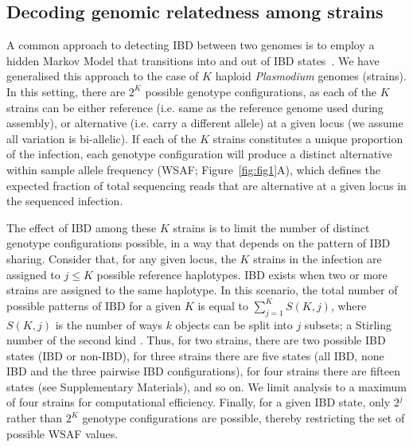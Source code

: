 \documentclass[9pt,lineno]{elife}
\begin{document}
\subsection{Decoding genomic relatedness among strains}

A common approach to detecting IBD between two genomes is to employ a hidden Markov Model that transitions into and out of IBD states~\citep{Chang2015, Gusev2009, Gusev2011}.  We have generalised this approach to the case of $K$ haploid {\it Plasmodium} genomes (strains). In this setting, there are $2^K$ possible genotype configurations, as each of the $K$ strains can be either reference (i.e. same as the reference genome used during assembly), or alternative (i.e. carry a different allele) at a given locus (we assume all variation is bi-allelic). If each of the $K$ strains constitutes a unique proportion of the infection, each genotype configuration will produce a distinct alternative within sample allele frequency (WSAF; Figure~\ref{fig:fig1}A), which defines the expected fraction of total sequencing reads that are alternative at a given locus in the sequenced infection.

The effect of IBD among these $K$ strains is to limit the number of distinct genotype configurations possible, in a way that depends on the pattern of IBD sharing. Consider that, for any given locus, the $K$ strains in the infection are assigned to $j \leq K$ possible reference haplotypes. IBD exists when two or more strains are assigned to the same haplotype. In this scenario, the total number of possible patterns of IBD for a given $K$ is equal to $\sum_{j=1}^{K} S(K,j)$, where $S(K,j)$ is the number of ways $k$ objects can be split into $j$ subsets; a Stirling number of the second kind \citep{Ronald1988}. Thus, for two strains, there are two possible IBD states (IBD or non-IBD), for three strains there are five states (all IBD, none IBD and the three pairwise IBD configurations), for four strains there are fifteen states (see Supplementary Materials), and so on. We limit analysis to a maximum of four strains for computational efficiency. Finally, for a given IBD state, only $2^j$ rather than $2^K$ genotype configurations are possible, thereby restricting the set of possible WSAF values.
\end{document}
